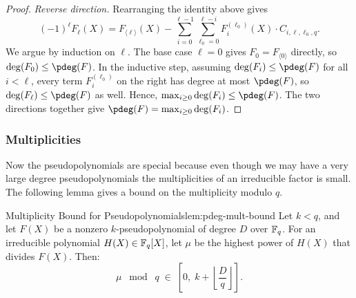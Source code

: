 \begin{proof}
  \medskip\noindent\textit{Reverse direction.} Rearranging the identity above gives
  \[
    (-1)^\ell F_\ell(X) = F_{\langle\ell\rangle}(X) - \sum_{i=0}^{\ell-1}\sum_{\ell_0=0}^{\ell-i} F_i^{(\ell_0)}(X)\cdot C_{i,\ell,\ell_0,q}.
  \]
  We argue by induction on $\ell$. The base case $\ell = 0$ gives $F_0 = F_{\langle 0\rangle}$ directly, so $\deg(F_0) \leq \pdeg(F)$. In the inductive step, assuming $\deg(F_i) \leq \pdeg(F)$ for all $i < \ell$, every term $F_i^{(\ell_0)}$ on the right has degree at most $\pdeg(F)$, so $\deg(F_\ell) \leq \pdeg(F)$ as well. Hence, $\max_{i \geq 0}\deg(F_i) \leq \pdeg(F)$. The two directions together give $\pdeg(F) = \max_{i \geq 0} \deg(F_i)$.
\end{proof}



\subsubsection{Multiplicities}\label{subsec:pdeg-mult}

Now the pseudopolynomials are special because even though we may have a very large degree pseudopolynomials the multiplicities of an irreducible factor is small. The following lemma gives a bound on the multiplicity modulo $q$.

\begin{lemma}{Multiplicity Bound for Pseudopolynomials}{lem:pdeg-mult-bound}
  Let $k < q$, and let $F(X)$ be a nonzero $k$-pseudopolynomial of degree $D$ over $\mathbb{F}_q$. For an irreducible polynomial $H(X) \in \mathbb{F}_q[X]$, let $\mu$ be the highest power of $H(X)$ that divides $F(X)$. Then:
  \[
    \mu \;\bmod\; q \;\in\; \left[0,\; k + \left\lfloor\frac{D}{q}\right\rfloor\right].
  \]
\end{lemma}

